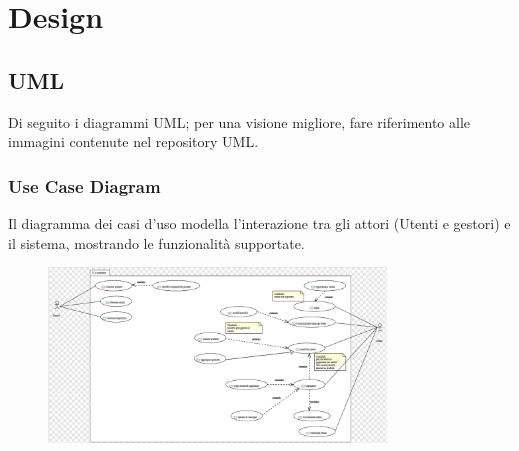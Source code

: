 \documentclass[a4paper,12pt]{article}
\begin{document}
\section{Design}
\subsection{UML}
Di seguito i diagrammi UML; per una visione migliore, fare riferimento alle immagini contenute nel repository UML.
\subsubsection{Use Case Diagram}
Il diagramma dei casi d'uso modella l'interazione tra gli attori (Utenti e gestori) e il sistema, mostrando le funzionalità supportate.
\begin{figure}[H]
    \centering
    \includegraphics[width=0.8\textwidth]{../UML/UML png/UseCaseDiagram.png}
    \label{fig:Use Case Diagram}
\end{figure}
\end{document}

